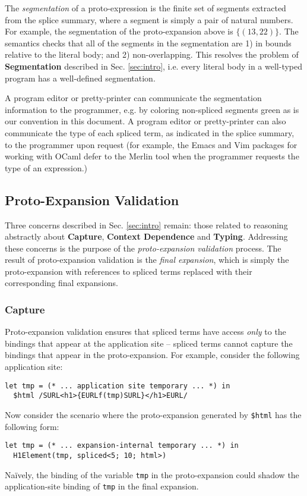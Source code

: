 \documentclass[acmlarge,review,anonymous]{acmart}\settopmatter{printfolios=true}
\newcommand{\li}[1]{\lstinline{#1}}
\begin{document}
The \emph{segmentation} of a proto-expression is the finite set of segments extracted from the splice summary, where a segment is simply a pair of natural numbers. For example, the segmentation of the proto-expansion above is $\{(13, 22)\}$. 
The semantics checks that all of the segments in the segmentation are 1) in bounds relative to the literal body; and 2) non-overlapping. 
This resolves the problem of \textbf{Segmentation} described in Sec. \ref{sec:intro}, i.e. every literal body in a well-typed program has a well-defined segmentation. 

A program editor or pretty-printer can communicate the segmentation information to the programmer, e.g. by coloring non-spliced segments green as is our convention in this document. 
A program editor or pretty-printer can also communicate the type of each spliced term, as indicated in the splice summary, to the programmer upon request (for example, the Emacs and Vim packages for working with OCaml defer to the Merlin tool when the programmer requests the type of an expression.)


\subsection{Proto-Expansion Validation}\label{sec:uetsms-validation}
Three concerns described in Sec. \ref{sec:intro} remain: those related to reasoning abstractly about \textbf{Capture}, \textbf{Context Dependence} and \textbf{Typing}. Addressing these concerns is the purpose of the \emph{proto-expansion validation} process. 
The result of proto-expansion validation is the \emph{final expansion}, which is simply the proto-expansion with  references to spliced terms replaced with their corresponding final expansions. 


\subsubsection{Capture}
Proto-expansion validation ensures that spliced terms have access \emph{only} to the bindings that appear at the application site -- spliced terms cannot capture the bindings that appear in the proto-expansion. For example, consider the following application site:
\begin{lstlisting}[numbers=none]
  let tmp = (* ... application site temporary ... *) in 
  $html /SURL<h1>{EURLf(tmp)SURL}</h1>EURL/
\end{lstlisting}
Now consider the scenario where the proto-expansion generated by \li{$html} has the following form:
\begin{lstlisting}[numbers=none]
  let tmp = (* ... expansion-internal temporary ... *) in 
  H1Element(tmp, spliced<5; 10; html>)
\end{lstlisting}
Na\"ively, the binding of the variable \li{tmp} in the proto-expansion could shadow the application-site binding of \li{tmp} in the final expansion.
\end{document}
